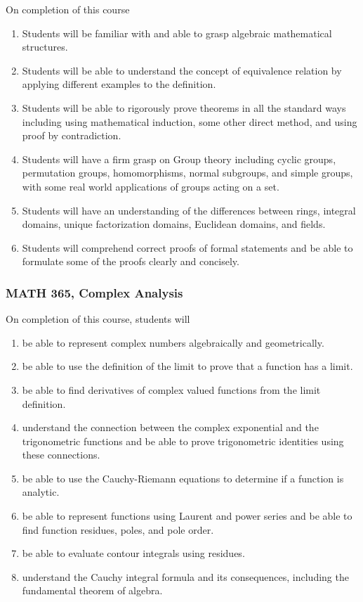 \documentclass[11pt]{article}
\newenvironment{alphalist}{
\begin{enumerate}[label=(\arabic*),widest=107 ,leftmargin=25pt, itemsep=0pt]}
{\end{enumerate}}
\begin{document}
On completion of this course
\begin{alphalist}
\item Students will be familiar with and able to grasp algebraic mathematical structures.
\item Students will be able to understand the concept of equivalence relation by applying different examples to the definition.
\item Students will be able to rigorously prove theorems in all the standard ways including using mathematical induction, some other direct method, and using proof by contradiction.
\item Students will have a firm grasp on Group theory including cyclic groups, permutation groups, homomorphisms, normal subgroups, and simple groups, with some real world applications of groups acting on a set. 
\item Students will have an understanding of the differences between rings, integral domains, unique factorization domains, Euclidean domains, and fields.
\item Students will comprehend correct proofs of formal statements and be able to formulate some of the proofs clearly and concisely.
\end{alphalist}

\subsubsection*{MATH 365, Complex Analysis}

On completion of this course, students will 
\begin{alphalist}
    \item be able to represent complex numbers algebraically and geometrically.
    \item be able to use the definition of the limit to prove that a function has a limit.
    \item be able to find derivatives of complex valued functions from the limit definition.
    \item understand the connection between the complex exponential and the trigonometric functions and be able to 
        prove trigonometric identities using these connections.
    \item be able to use the Cauchy-Riemann equations to determine if a function is 
          analytic.
    \item be able to represent functions using Laurent and power series and be able 
           to find function residues, poles, and pole order.
    \item be able to evaluate contour integrals using residues.
    \item understand the Cauchy integral formula and its consequences,  including the 
       fundamental theorem of algebra.
\end{alphalist}
\end{document}
